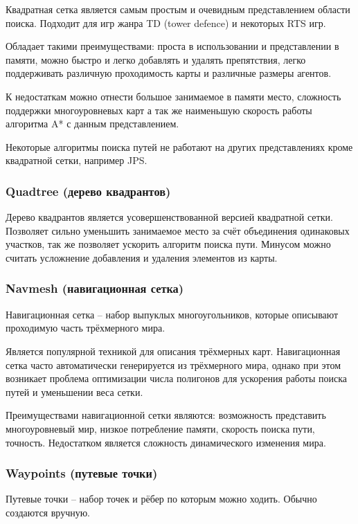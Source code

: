 Квадратная сетка является самым простым и очевидным представлением области поиска. Подходит для игр жанра TD (tower defence) и некоторых RTS игр. 

Обладает такими преимуществами: проста в использовании и представлении в памяти, можно быстро и легко добавлять и удалять препятствия, легко поддерживать различную проходимость карты и различные размеры агентов. 

К недостаткам можно отнести большое занимаемое в памяти место, сложность поддержки многоуровневых карт а так же наименьшую скорость работы алгоритма A* с данным представлением. 

Некоторые алгоритмы поиска путей не работают на других представлениях кроме квадратной сетки, например JPS.

\subsubsection{Quadtree (дерево квадрантов)}

Дерево квадрантов является усовершенствованной версией квадратной сетки. Позволяет сильно уменьшить занимаемое место за счёт объединения одинаковых участков, так же позволяет ускорить алгоритм поиска пути. Минусом можно считать усложнение добавления и удаления элементов из карты.

\subsubsection{Navmesh (навигационная сетка)}

Навигационная сетка -- набор выпуклых многоугольников, которые описывают проходимую часть трёхмерного мира. 

Является популярной техникой для описания трёхмерных карт. Навигационная сетка часто автоматически генерируется из трёхмерного мира, однако при этом возникает проблема оптимизации числа полигонов для ускорения работы поиска путей и уменьшении веса сетки.

Преимуществами навигационной сетки являются: возможность представить многоуровневый мир, низкое потребление памяти, скорость поиска пути, точность. Недостатком является сложность динамического изменения мира.

\subsubsection{Waypoints (путевые точки)}

Путевые точки -- набор точек и рёбер по которым можно ходить. Обычно создаются вручную.

